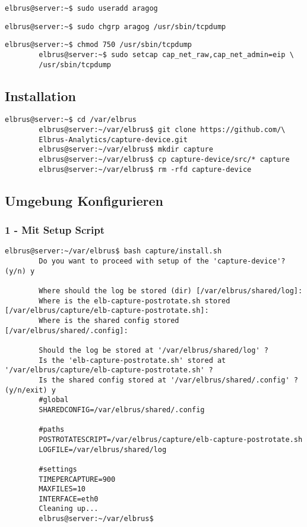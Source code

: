 \documentclass{article}
\begin{document}
	\begin{lstlisting}[caption={Anlegen eines Users der Berechtigungen zum ausführen von 'tcpdump' erhält.}]
		elbrus@server:~$ sudo useradd aragog
	\end{lstlisting}
	
	\begin{lstlisting}[caption={Zuweisen von 'tcpdump' zu der Gruppe 'aragog'.}]
		elbrus@server:~$ sudo chgrp aragog /usr/sbin/tcpdump
	\end{lstlisting}
	
	\begin{lstlisting}[caption={Ändern der Berechtigungen auf 'tcpdump'.}]
		elbrus@server:~$ chmod 750 /usr/sbin/tcpdump
		elbrus@server:~$ sudo setcap cap_net_raw,cap_net_admin=eip \
		/usr/sbin/tcpdump
	\end{lstlisting}
	
	\subsection{Installation}
	\begin{lstlisting}[caption={Clonen der Software von GitHub.}]
		elbrus@server:~$ cd /var/elbrus
		elbrus@server:~/var/elbrus$ git clone https://github.com/\
		Elbrus-Analytics/capture-device.git
		elbrus@server:~/var/elbrus$ mkdir capture
		elbrus@server:~/var/elbrus$ cp capture-device/src/* capture
		elbrus@server:~/var/elbrus$ rm -rfd capture-device
	\end{lstlisting}
	
	\newpage
	\subsection[file config]{Umgebung Konfigurieren}
	\subsubsection{1 - Mit Setup Script}
	\begin{lstlisting}[caption={Ausführen des 'install.sh' Scripts.}, breaklines=true,]
		elbrus@server:~/var/elbrus$ bash capture/install.sh
		Do you want to proceed with setup of the 'capture-device'? (y/n) y
		
		Where should the log be stored (dir) [/var/elbrus/shared/log]:
		Where is the elb-capture-postrotate.sh stored [/var/elbrus/capture/elb-capture-postrotate.sh]:
		Where is the shared config stored [/var/elbrus/shared/.config]:
		
		Should the log be stored at '/var/elbrus/shared/log' ?
		Is the 'elb-capture-postrotate.sh' stored at '/var/elbrus/capture/elb-capture-postrotate.sh' ?
		Is the shared config stored at '/var/elbrus/shared/.config' ? (y/n/exit) y
		#global
		SHAREDCONFIG=/var/elbrus/shared/.config
		
		#paths
		POSTROTATESCRIPT=/var/elbrus/capture/elb-capture-postrotate.sh
		LOGFILE=/var/elbrus/shared/log
		
		#settings
		TIMEPERCAPTURE=900
		MAXFILES=10
		INTERFACE=eth0
		Cleaning up...
		elbrus@server:~/var/elbrus$
	\end{lstlisting}
	
\end{document}
